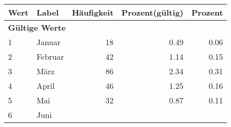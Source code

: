      \begin{longtable}{lXrrr}
     \toprule
     \textbf{Wert} & \textbf{Label} & \textbf{Häufigkeit} & \textbf{Prozent(gültig)} & \textbf{Prozent} \\
     \endhead
     \midrule
     \multicolumn{5}{l}{\textbf{Gültige Werte}}\\

     1 &
     \multicolumn{1}{X}{ Januar   } &


       \num{18} &
       \num[round-mode=places,round-precision=2]{0.49} &
         \num[round-mode=places,round-precision=2]{0.06} \\

     2 &
     \multicolumn{1}{X}{ Februar   } &


       \num{42} &
       \num[round-mode=places,round-precision=2]{1.14} &
         \num[round-mode=places,round-precision=2]{0.15} \\

     3 &
     \multicolumn{1}{X}{ März   } &


       \num{86} &
       \num[round-mode=places,round-precision=2]{2.34} &
         \num[round-mode=places,round-precision=2]{0.31} \\

     4 &
     \multicolumn{1}{X}{ April   } &


       \num{46} &
       \num[round-mode=places,round-precision=2]{1.25} &
         \num[round-mode=places,round-precision=2]{0.16} \\

     5 &
     \multicolumn{1}{X}{ Mai   } &


       \num{32} &
       \num[round-mode=places,round-precision=2]{0.87} &
         \num[round-mode=places,round-precision=2]{0.11} \\

     6 &
     \multicolumn{1}{X}{ Juni   } &



\end{longtable}
